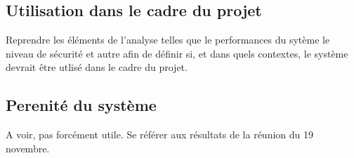 \documentclass{../res/univ-projet}
\begin{document}
  \subsection{Utilisation dans le cadre du projet}
  Reprendre les éléments de l'analyse telles que le performances du sytème le niveau de sécurité et autre afin de définir si, et dans quels contextes, le système devrait
  \^etre utlisé dans le cadre du projet.
  
  \subsection{Perenité du système}
  A voir, pas forcément utile. Se référer aux résultats de la réunion du 19 novembre.
    
\end{document}
